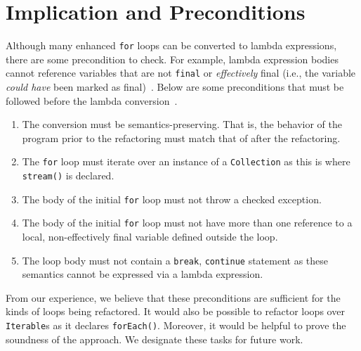 \section{Implication and Preconditions}

Although many enhanced \lstinline{for} loops can be converted to lambda
expressions, there are some precondition to check. For example, lambda
expression bodies cannot reference variables that are not \lstinline{final} or
\emph{effectively} final (i.e., the variable \emph{could have} been marked as final)~\cite{gosling2014java}.  Below are some preconditions that must be followed
before the lambda conversion~\cite{gyori2013}. 

\begin{enumerate}

    \item The conversion must be semantics-preserving. That is, the behavior
        of the program prior to the refactoring must match that of after the
        refactoring.

    \item The \lstinline{for} loop must iterate over an instance of a
        \lstinline{Collection} as this is where \lstinline{stream()} is
        declared.

    \item The body of the initial \lstinline{for} loop must not throw a
        checked exception. 

    \item The body of the initial \lstinline{for} loop must not have more than
        one reference to a local, non-effectively final variable defined
        outside the loop.

    \item The loop body must not contain a \lstinline{break},
        \lstinline{continue} statement as these semantics cannot be expressed
        via a lambda expression.  

\end{enumerate}

From our experience, we believe that these preconditions are sufficient for
the kinds of loops being refactored. It would also be possible to refactor
loops over \lstinline{Iterable}s as it declares \lstinline{forEach()}.
Moreover, it would be helpful to prove the soundness of the approach. We
designate these tasks for future work.
